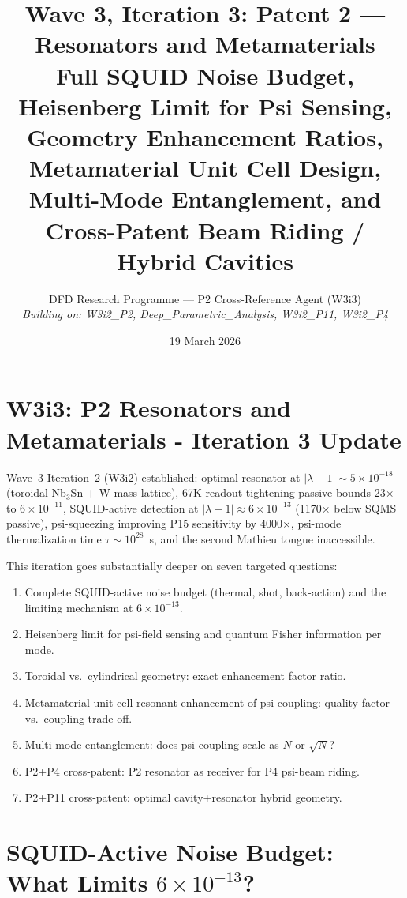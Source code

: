 \documentclass[11pt,twocolumn]{article}
\title{Wave 3, Iteration 3: Patent 2 --- Resonators and Metamaterials\\
\large Full SQUID Noise Budget, Heisenberg Limit for Psi Sensing,\\
Geometry Enhancement Ratios, Metamaterial Unit Cell Design,\\
Multi-Mode Entanglement, and Cross-Patent Beam Riding / Hybrid Cavities}
\author{DFD Research Programme --- P2 Cross-Reference Agent (W3i3)\\
\textit{Building on: W3i2\_P2, Deep\_Parametric\_Analysis, W3i2\_P11, W3i2\_P4}}
\date{19 March 2026}
\newcommand{\lam}{\lambda}
\newcommand{\ee}[1]{\times 10^{#1}}
\theoremstyle{definition}
\theoremstyle{remark}
\begin{document}
\maketitle
\tableofcontents

\section*{W3i3: P2 Resonators and Metamaterials - Iteration 3 Update}

Wave~3 Iteration~2 (W3i2) established: optimal resonator at $|\lam-1| \sim
5\ee{-18}$ (toroidal Nb$_3$Sn + W mass-lattice), 67K readout tightening
passive bounds 23$\times$ to $6\ee{-11}$, SQUID-active detection at
$|\lam-1| \approx 6\ee{-13}$ (1170$\times$ below SQMS passive), psi-squeezing
improving P15 sensitivity by 4000$\times$, psi-mode thermalization time
$\tau \sim 10^{28}$~s, and the second Mathieu tongue inaccessible.

This iteration goes substantially deeper on seven targeted questions:
\begin{enumerate}[nosep]
\item Complete SQUID-active noise budget (thermal, shot, back-action)
      and the limiting mechanism at $6\ee{-13}$.
\item Heisenberg limit for psi-field sensing and quantum Fisher information
      per mode.
\item Toroidal vs.\ cylindrical geometry: exact enhancement factor ratio.
\item Metamaterial unit cell resonant enhancement of psi-coupling: quality
      factor vs.\ coupling trade-off.
\item Multi-mode entanglement: does psi-coupling scale as $N$ or
      $\sqrt{N}$?
\item P2+P4 cross-patent: P2 resonator as receiver for P4 psi-beam riding.
\item P2+P11 cross-patent: optimal cavity+resonator hybrid geometry.
\end{enumerate}

\section{SQUID-Active Noise Budget: What Limits $6\times10^{-13}$?}
\label{sec:noise_budget}
\end{document}
